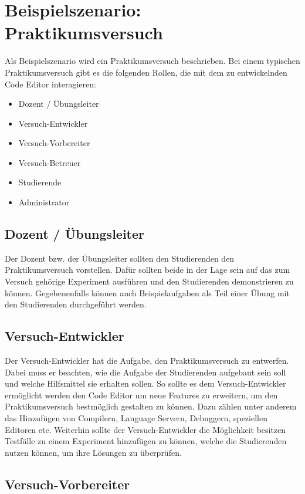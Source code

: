 \section{Beispielszenario: Praktikumsversuch} \label{beispielszenario}

Als Beispielszenario wird ein Praktikumsversuch beschrieben. Bei einem typischen Praktikumsversuch gibt es die folgenden Rollen, die mit dem zu entwickelnden Code Editor interagieren:

\begin{itemize}
    \item Dozent / Übungsleiter
    \item Versuch-Entwickler
    \item Versuch-Vorbereiter
    \item Versuch-Betreuer
    \item Studierende
    \item Administrator
\end{itemize}

\subsection{Dozent / Übungsleiter}

Der Dozent bzw. der Übungsleiter sollten den Studierenden den Praktikumsversuch vorstellen. Dafür sollten beide in der Lage sein auf das zum Versuch gehörige Experiment ausführen und den Studierenden demonstrieren zu können. Gegebenenfalls können auch Beispielaufgaben als Teil einer Übung mit den Studierenden durchgeführt werden.

\subsection{Versuch-Entwickler}

Der Versuch-Entwickler hat die Aufgabe, den Praktikumsversuch zu entwerfen. Dabei muss er beachten, wie die Aufgabe der Studierenden aufgebaut sein soll und welche Hilfsmittel sie erhalten sollen. So sollte es dem Versuch-Entwickler ermöglicht werden den Code Editor um neue Features zu erweitern, um den Praktikumsversuch bestmöglich gestalten zu können. Dazu zählen unter anderem das Hinzufügen von Compilern, Language Servern, Debuggern, speziellen Editoren etc. Weiterhin sollte der Versuch-Entwickler die Möglichkeit besitzen Testfälle zu einem Experiment hinzufügen zu können, welche die Studierenden nutzen können, um ihre Lösungen zu überprüfen.

\subsection{Versuch-Vorbereiter}

